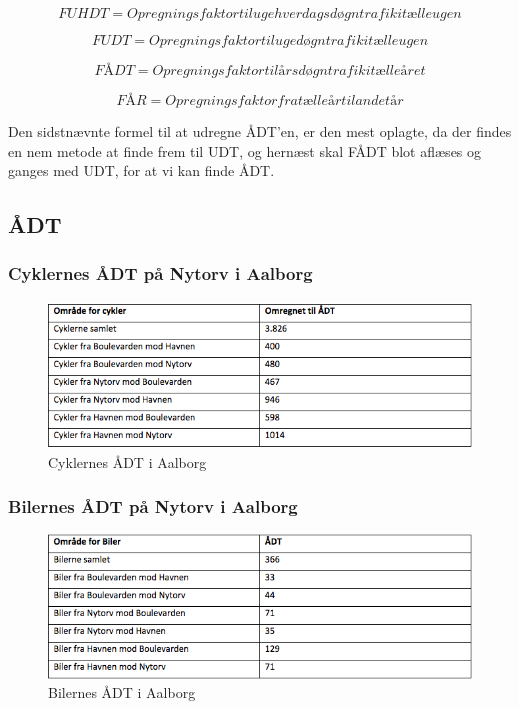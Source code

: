 $$FUHDT = Opregningsfaktor til ugehverdagsdøgntrafik i tælleugen$$

$$FUDT = Opregningsfaktor til ugedøgntrafik i tælleugen$$

$$FÅDT = Opregningsfaktor til årsdøgntrafik i tælleåret$$

$$FÅR = Opregningsfaktor fra tælleår til andet år$$

Den sidstnævnte formel til at udregne ÅDT’en, er den mest oplagte, da der findes en nem metode at finde frem til UDT, og hernæst skal FÅDT blot aflæses og ganges med UDT, for at vi kan finde ÅDT.

\subsection{ÅDT}
\label{AEDT}
\subsubsection{Cyklernes ÅDT på Nytorv i Aalborg}
\begin{figure}[htbp]
   \centering
   \begin{adjustbox}{max width=\textwidth}
     \includegraphics[scale=0.8]{figures/Billederogfigur/cykleradt.jpg}
  \end{adjustbox}
   \caption{Cyklernes ÅDT i Aalborg}
   \label{fig:cykleradt}
 \end{figure}
 
 \subsubsection{Bilernes ÅDT på Nytorv i Aalborg}
 \begin{figure}[htbp]
   \centering
   \begin{adjustbox}{max width=\textwidth}
     \includegraphics[scale=0.6]{figures/Billederogfigur/bileradt.jpg}
  \end{adjustbox}
   \caption{Bilernes ÅDT i Aalborg}
   \label{fig:bileradt}
 \end{figure}
 
